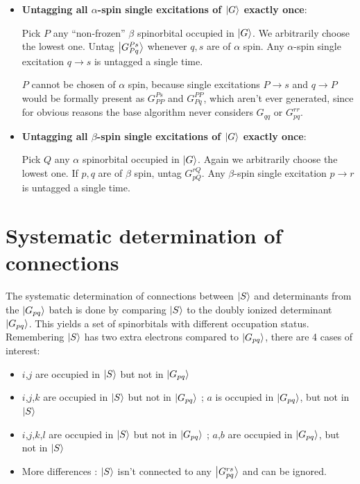 \documentclass[./thesis.tex]{subfiles}
\begin{document}
\begin{itemize}
\item
\textbf{Untagging all $\alpha$-spin single excitations of $\ket G$ exactly once}:

Pick $P$ any ``non-frozen'' $\beta$ spinorbital occupied in $\ket G$. We arbitrarily choose the lowest one. Untag $\ket {G_{Pq}^{Ps}}$ whenever $q,s$ are of $\alpha$ spin. Any $\alpha$-spin single excitation $q \rightarrow  s$ is untagged a single time.

$P$ cannot be chosen of $\alpha$ spin, because single excitations $P \rightarrow  s$ and $q \rightarrow  P$ would be formally present as $G_{PP}^{Ps}$ and $G_{Pq}^{PP}$, which aren't ever generated, since for obvious reasons the base algorithm never considers $G_{qq}$ or $G_{pq}^{rr}$.
\item
\textbf{Untagging all $\beta$-spin single excitations of $\ket G$ exactly once}:

Pick $Q$ any $\alpha$ spinorbital occupied in $\ket G$. Again we arbitrarily choose the lowest one. If $p,q$ are of $\beta$ spin, untag $G_{pQ}^{rQ}$. Any $\beta$-spin single excitation $p \rightarrow  r$ is untagged a single time.
\end{itemize}



\section{Systematic determination of connections}

The systematic determination of connections between $\ket S$ and determinants from the $\ket {G_{pq}}$ batch is done by comparing $\ket S$ to the doubly ionized determinant $\ket {G_{pq}}$. This yields a set of spinorbitals with different occupation status. Remembering $\ket S$ has two extra electrons compared to $\ket {G_{pq}}$, there are 4 cases of interest:
\begin{itemize}

\item
$i$,$j$ are occupied in $\ket S$ but not in $\ket {G_{pq}}$
\item
$i$,$j$,$k$ are occupied in $\ket S$ but not in $\ket {G_{pq}}$ ; $a$ is occupied in $\ket {G_{pq}}$, but not in $\ket S$
\item
$i$,$j$,$k$,$l$ are occupied in $\ket S$ but not in $\ket {G_{pq}}$ ; $a$,$b$ are occupied in $\ket {G_{pq}}$, but not in $\ket S$
\item
More differences : $\ket S$ isn't connected to any $\ket {G_{pq}^{rs}}$ and can be ignored. 

\end{itemize}
\end{document}
